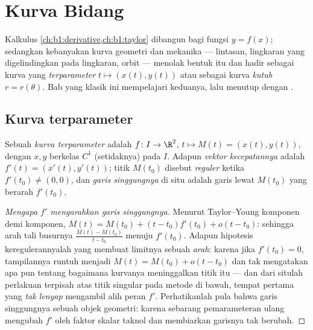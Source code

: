 \chapter{Kurva Bidang}\label{ch:b1:curves}

Kalkulus \cref{ch:b1:derivative,ch:b1:taylor} dibangun bagi
fungsi $y = f(x)$; sedangkan kebanyakan kurva geometri dan mekanika ---
lintasan, lingkaran yang digelindingkan pada lingkaran, orbit --- menolak bentuk itu
dan hadir sebagai kurva yang \emph{terparameter} $t \mapsto (x(t),
y(t))$ atau sebagai kurva \emph{kutub} $r = r(\theta)$. Bab yang klasik
ini mempelajari keduanya, lalu menutup dengan .

\section{Kurva terparameter}

\begin{definition}\label{def:b1:curves:def}
Sebuah \emph{kurva terparameter} adalah  $f
\colon I \to \R^2$, $t \mapsto M(t) = (x(t), y(t))$, dengan $x, y$
berkelas $C^1$ (setidaknya) pada  $I$. Adapun \emph{vektor
kecepatannya} adalah $f'(t) = (x'(t), y'(t))$; titik $M(t_0)$ disebut
\emph{reguler} ketika $f'(t_0) \neq (0,0)$, dan \emph{garis singgungnya}
di situ adalah garis lewat $M(t_0)$ yang berarah $f'(t_0)$.
\end{definition}

\begin{proof}[Mengapa $f'$ mengarahkan garis singgungnya]
Menurut Taylor--Young komponen demi komponen, $M(t) = M(t_0) + (t - t_0) f'(t_0) +
o(t - t_0)$: sehingga arah tali busurnya $\frac{M(t) - M(t_0)}{t - t_0}$
menuju $f'(t_0)$. Adapun hipotesis keregulerannyalah yang membuat
limitnya sebuah \emph{arah}: karena jika $f'(t_0) = 0$, tampilannya runtuh
menjadi $M(t) = M(t_0) + o(t - t_0)$ dan tak mengatakan apa pun tentang bagaimana
kurvanya meninggalkan titik itu --- dan dari situlah perlakuan terpisah atas
titik singular pada metode di bawah, tempat  pertama
yang \emph{tak lenyap} mengambil alih peran $f'$.
Perhatikanlah pula bahwa garis singgungnya sebuah objek geometri: karena sebarang
pemarameteran ulang mengubah $f'$ oleh faktor skalar taknol dan
membiarkan garisnya tak berubah.
\end{proof}

